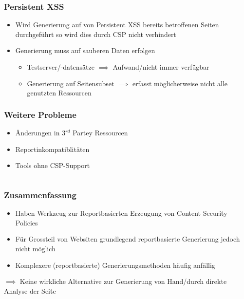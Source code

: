 \documentclass[handout]{beamer}
\begin{document}
\begin{frame}[c]
\frametitle{Persistent XSS}
\begin{itemize}
\item Wird Generierung auf von Persistent XSS bereits betroffenen Seiten durchgef\"uhrt so wird dies durch CSP nicht verhindert
\item Generierung muss auf sauberen Daten erfolgen
\begin{itemize}
\item Testserver/-datens\"atze $\implies$ Aufwand/nicht immer verf\"ugbar
\item Generierung auf Seitensubset $\implies$ erfasst m\"oglicherweise nicht alle genutzten Ressourcen
\end{itemize}
\end{itemize}
\end{frame}


\begin{frame}
\frametitle{Weitere Probleme}
\begin{itemize}
\item \"Anderungen in 3$^{rd}$ Partey Ressourcen
\item Reportinkompatiblit\"aten
\item Tools ohne CSP-Support
\end{itemize}
\end{frame}

\section{}

\begin{frame}[c]
\frametitle{Zusammenfassung}
\begin{itemize}
\item Haben Werkzeug zur Reportbasierten Erzeugung von Content Security Policies
\item F\"ur Grossteil von Websiten grundlegend reportbasierte Generierung jedoch nicht m\"oglich
\item Komplexere (reportbasierte) Generierungsmethoden h\"aufig anf\"allig
\end{itemize}
$\implies$ Keine wirkliche Alternative zur Generierung von Hand/durch direkte Analyse der Seite
\end{frame}
\end{document}
